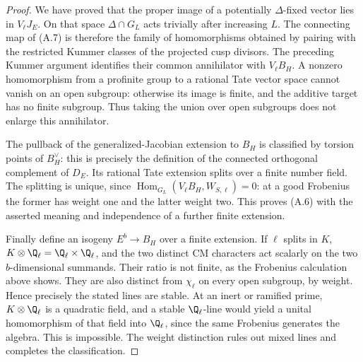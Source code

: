 \begin{proof}
We have proved that the proper image of a potentially $\Delta$-fixed
vector lies in $V_\ell J_E$. On that space $\Delta\cap G_L$ acts
trivially after increasing $L$. The connecting map of (A.7) is therefore
the family of homomorphisms obtained by pairing with the restricted
Kummer classes of the projected cusp divisors. The preceding Kummer
argument identifies their common annihilator with $V_\ell B_H$.
A nonzero homomorphism from a profinite group to a rational Tate vector
space cannot vanish on an open subgroup: otherwise its image is finite,
and the additive target has no finite subgroup. Thus taking the union
over open subgroups does not enlarge this annihilator.

The pullback of the generalized-Jacobian extension to $B_H$ is classified
by torsion points of $B_H^\vee$: this is precisely the definition of the
connected orthogonal complement of $D_E$. Its rational Tate extension
splits over a finite number field. The splitting is unique, since
$\operatorname{Hom}_{G_L}(V_\ell B_H,W_{S,\ell})=0$: at a good
Frobenius the former has weight one and the latter weight two. This
proves (A.6) with the asserted meaning and independence of a further
finite extension.

Finally define an isogeny $E^b\to B_H$ over a finite extension. If $\ell$
splits in $K$, $K\otimes\Q_\ell=\Q_\ell\times\Q_\ell$, and the
two distinct CM characters act scalarly on the two $b$-dimensional
summands. Their ratio is not finite, as the Frobenius calculation above
shows. They are also distinct from $\chi_\ell$ on every open subgroup,
by weight. Hence precisely the stated lines are stable. At an inert or
ramified prime, $K\otimes\Q_\ell$ is a quadratic field, and a stable
$\Q_\ell$-line would yield a unital homomorphism of that field into
$\Q_\ell$, since the same Frobenius generates the algebra. This is
impossible. The weight distinction rules out mixed lines and completes
the classification.
\end{proof}


